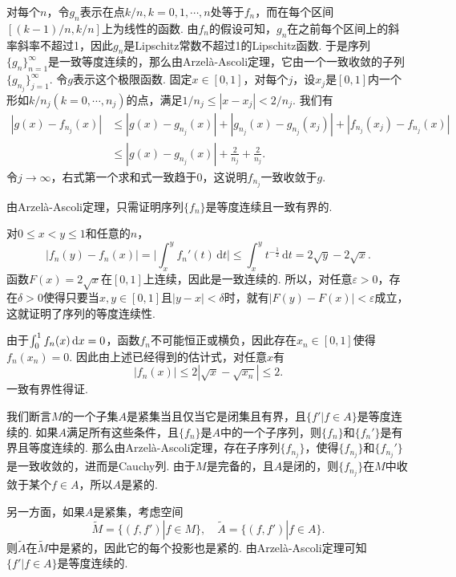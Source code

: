 \begin{ans}
  对每个$n$，令$g_n$表示在点$k/n,k=0,1,\cdots,n$处等于$f_n$，而在每个区间$[(k-1)/n,k/n]$上为线性的函数. 由$f_n$的假设可知，$g_n$在之前每个区间上的斜率斜率不超过1，因此$g_n$是Lipschitz常数不超过1的Lipschitz函数. 于是序列$\{g_n\}_{n=1}^\infty$是一致等度连续的，那么由Arzel\`a-Ascoli定理，它由一个一致收敛的子列$\{g_{n_j}\}_{j=1}^\infty$. 令$g$表示这个极限函数. 固定$x\in[0,1]$，对每个$j$，设$x_j$是$[0,1]$内一个形如$k/n_j(k=0,\cdots,n_j)$的点，满足$1/n_j\le|x-x_j|<2/n_j$. 我们有
  \begin{align*}
    |g(x)-f_{n_j}(x)| &\le |g(x)-g_{n_j}(x)| + |g_{n_j}(x)-g_{n_j}(x_j)| +
    |f_{n_j}(x_j)-f_{n_j}(x)| \\
    & \le |g(x)-g_{n_j}(x)| +\frac2{n_j}+\frac2{n_j}.
  \end{align*}
  令$j\to\infty$，右式第一个求和式一致趋于0，这说明$f_{n_j}$一致收敛于$g$.
\end{ans}

\begin{ans}
  由Arzel\`a-Ascoli定理，只需证明序列$\{f_n\}$是等度连续且一致有界的.

  对$0\le x<y\le1$和任意的$n$，
  \[
    |f_n(y)-f_n(x)| = \bigg| \int_x^yf_n'(t)\,\mathrm dt \bigg|
    \le \int_x^yt^{-\frac12}\,\mathrm dt = 2\sqrt y-2\sqrt x.
  \]
  函数$F(x)=2\sqrt x$在$[0,1]$上连续，因此是一致连续的. 所以，对任意$\varepsilon>0$，存在$\delta>0$使得只要当$x,y\in[0,1]$且$|y-x|<\delta$时，就有$|F(y)-F(x)|<\varepsilon$成立， 这就证明了序列的等度连续性.

  由于$\int_0^1f_n(x)\,\mathrm dx=0$，函数$f_n$不可能恒正或横负，因此存在$x_n\in[0,1]$使得$f_n(x_n)=0$. 因此由上述已经得到的估计式，对任意$x$有
  \[ |f_n(x)|\le 2|\sqrt x-\sqrt{x_n}| \le2. \]
  一致有界性得证.
\end{ans}

\begin{ans}
  我们断言$M$的一个子集$A$是紧集当且仅当它是闭集且有界，且$\{f'|f\in A\}$是等度连续的. 如果$A$满足所有这些条件，且$\{f_n\}$是$A$中的一个子序列，则$\{f_n\}$和$\{f_n'\}$是有界且等度连续的. 那么由Arzel\`a-Ascoli定理，存在子序列$\{f_{n_j}\}$，使得$\{f_{n_j}\}$和$\{f_{n_j}'\}$是一致收敛的，进而是Cauchy列. 由于$M$是完备的，且$A$是闭的，则$\{f_{n_j}\}$在$M$中收敛于某个$f\in A$，所以$A$是紧的.

  另一方面，如果$A$是紧集，考虑空间
  \[
    \widetilde{M} = \{(f,f')|f\in M\},\quad
    \widetilde{A} = \{(f,f')|f\in A\}.
  \]
  则$\widetilde{A}$在$\widetilde{M}$中是紧的，因此它的每个投影也是紧的. 由Arzel\`a-Ascoli定理可知$\{f'|f\in A\}$是等度连续的.
\end{ans}

